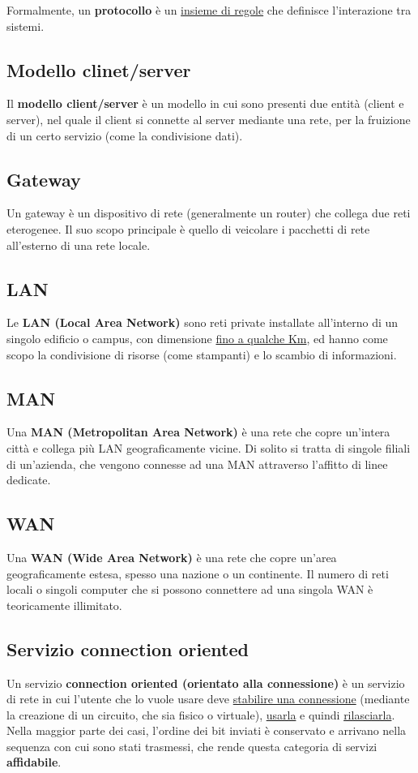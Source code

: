        Formalmente, un \textbf{protocollo} è un \underline{insieme di regole} che definisce l’interazione tra sistemi.

        \subsection{Modello clinet/server}
        Il \textbf{modello client/server} è un modello in cui sono presenti due entità (client e server), nel
        quale il client si connette al server mediante una rete, per la fruizione di un certo servizio (come
        la condivisione dati).

        \subsection{Gateway}
        Un gateway è un dispositivo di rete (generalmente un router) che collega due reti eterogenee.
        Il suo scopo principale è quello di veicolare i pacchetti di rete all’esterno di una rete locale.

        \subsection{LAN}
        Le \textbf{LAN (Local Area Network)} sono reti private installate all’interno di un singolo edificio o
        campus, con dimensione \underline{fino a qualche Km}, ed hanno come scopo la condivisione di risorse
        (come stampanti) e lo scambio di informazioni.

        \subsection{MAN}
        Una \textbf{MAN (Metropolitan Area Network)} è una rete che copre un’intera città e collega più LAN
        geograficamente vicine. Di solito si tratta di singole filiali di un’azienda, che vengono connesse
        ad una MAN attraverso l’affitto di linee dedicate.

        \subsection{WAN}
        Una \textbf{WAN (Wide Area Network)} è una rete che copre un’area geograficamente estesa, spesso
        una nazione o un continente. Il numero di reti locali o singoli computer che si possono
        connettere ad una singola WAN è teoricamente illimitato.

        \subsection{Servizio connection oriented}
        Un servizio \textbf{connection oriented (orientato alla connessione)} è un servizio di rete in cui
        l’utente che lo vuole usare deve \underline{stabilire una connessione} (mediante la creazione di un circuito,
        che sia fisico o virtuale), \underline{usarla} e quindi \underline{rilasciarla}. Nella maggior parte dei casi, l’ordine dei bit
        inviati è conservato e arrivano nella sequenza con cui sono stati trasmessi, che rende questa
        categoria di servizi \textbf{affidabile}.\newline

